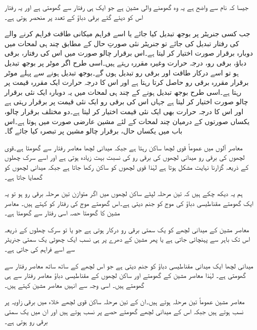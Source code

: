 جیسا کہ نام سے واضح ہے یہ وہ گھومنے والی مشین ہے جو ایک ہی رفتار سے گھومتی ہے اور یہ رفتار اس کو دیئے گئے برقی دباؤ کے تعدد پر منحصر ہوتی ہے۔

جب کسی جنریٹر پر بوجھ تبدیل کیا جائے یا اسے فراہم میکانی طاقت فراہم کرنے والے کی رفتار تبدیل کی جائے تو جنریٹر نئی صورتِ حال کے  مطابق چند ہی لمحات میں دوبارہ برقرار  صورت اختیار کر لیتا ہے۔اس برقرار چالو صورت میں اس کی رفتار، برقی دباؤ، برقی رو، درجہ حرارت وغیرہ  مقررہ رہتے ہیں۔اسی طرح اگر موٹر پر بوجھ تبدیل ہو تو اسے درکار طاقت اور برقی رو تبدیل ہوں گے۔بوجھ تبدیل ہونے سے پہلے موٹر برقرار مقررہ برقی رو حاصل کرتا رہتا ہے اور اس کا درجہ حرارت ایک مقررہ قیمت پر رہتا ہے۔اسی طرح بوجھ تبدیل ہونے کے چند ہی لمحات میں یہ دوبارہ ایک نئی برقرار چالو صورت اختیار کر لیتا ہے جہاں اس کی برقی رو ایک نئی قیمت پر برقرار رہتی ہے اور اس کا درجہ حرارت بھی ایک نئی قیمت اختیار کر لیتا ہے۔دو مختلف برقرار چالو، یکساں صورتوں کے درمیان چند لمحات کے لئے مشین عارضی صورت میں ہوتا ہے۔اس باب میں یکساں حال، برقرار چالو مشین پر تبصرہ کیا جائے گا۔ 

معاصر آلوں میں عموماً قوی لچھا ساکن رہتا ہے جبکہ میدانی لچھا معاصر رفتار سے گھومتا ہے۔قوی لچھوں کی برقی رو میدانی لچھوں کی برقی رو کی نسبت بہت زیادہ ہوتی ہے اور اسے سرک چھلوں کے ذریعہ گزارنا نہایت مشکل ہوتا ہے لہٰذا قوی لچھوں کو ساکن رکھا جاتا ہے جبکہ میدانی لچھوں کو گھمایا جاتا ہے۔

 ہم یہ دیکھ چکے ہیں کہ تین مرحلہ  لپٹے ساکن لچھوں میں اگر متوازن تین مرحلہ برقی رو ہو تو یہ ایک گھومتے مقناطیسی دباؤ کی موج کو جنم دیتی ہے۔اس گھومتے موج کی رفتار کو   کہتے ہیں۔ معاصر مشین کا گھومتا حصہ اسی رفتار سے گھومتا ہے۔ 

معاصر مشین کے میدانی لچھے کو یک سمتی برقی رو درکار ہوتی ہے جو یا تو سرک چھلوں کے ذریعہ اس تک باہر سے پہنچائی جاتی ہے یا پھر مشین کے دھرے پر ہی نسب ایک چھوٹی یک سمتی جنریٹر سے اسے فراہم کی جاتی ہے۔

میدانی لچھا ایک میدانی مقناطیسی دباؤ کو جنم دیتی ہے جو اس لچھے کے ساتھ ساتھ معاصر رفتار سے گھومتی ہے۔ لہٰذا معاصر مشین کے گھومتے اور ساکن لچھوں کے مقناطیسی دباؤ معاصر رفتار سے ہی گھومتے ہیں۔ اسی وجہ سے انہیں معاصر مشین کہتے ہیں۔

معاصر مشین عموماً تین مرحلہ ہوتے ہیں۔ان کے تین مرحلہ ساکن قوی لچھے خلاء میں   برقی زاویہ پر نسب ہوتے ہیں جبکہ اس کے میدانی لچھے گھومتے حصے پر نسب ہوتے ہیں اور ان میں یک سمتی برقی رو ہوتی ہے۔ 


